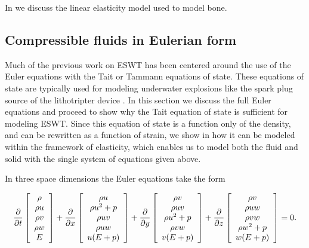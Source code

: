 \documentclass{article}
\begin{document}
In  we discuss the linear elasticity model used to model bone.


\subsection{Compressible fluids in Eulerian form} \label{sec:euler}
Much of the previous work on ESWT has been centered around the use of the Euler equations with the 
Tait or Tammann equations of state.  These equations of state are typically used for modeling 
underwater 
explosions like the spark plug source of the lithotripter device \cite{hamilton, ivings_toro}.  In this section 
we discuss the full Euler equations and proceed to show why the Tait equation of state is sufficient for 
modeling ESWT.  Since this equation of state is a function only of the density, and can be rewritten as
a function of strain, we show in  how it 
can be modeled within the framework of elasticity, which enables us to model both the fluid 
and solid with the single system of equations given above. 

In three space dimensions the Euler equations take the form
\begin{equation}
\label{eulereqn}
\frac{\partial}{\partial t}	\left[ \begin{array}{c} \rho \\ \rho u \\ \rho v \\ \rho w \\ E \end{array} \right  ]
+ \frac{\partial}{\partial x} \left[ \begin{array}{c} \rho u \\ \rho u^2 + p \\ \rho uv \\ \rho uw \\u(E+p) \end{array} \right]
	+ \frac{\partial}{\partial y} \left[ \begin{array}{c} \rho v \\ \rho uv \\ \rho u^2 + p \\ \rho vw \\v(E+p) \end{array} \right]
	+ \frac{\partial}{\partial z} \left[ \begin{array}{c} \rho v \\ \rho uw \\ \rho vw \\ \rho w^2+p \\w(E+p) \end{array} \right]
= 0.
\end{equation}
\end{document}

